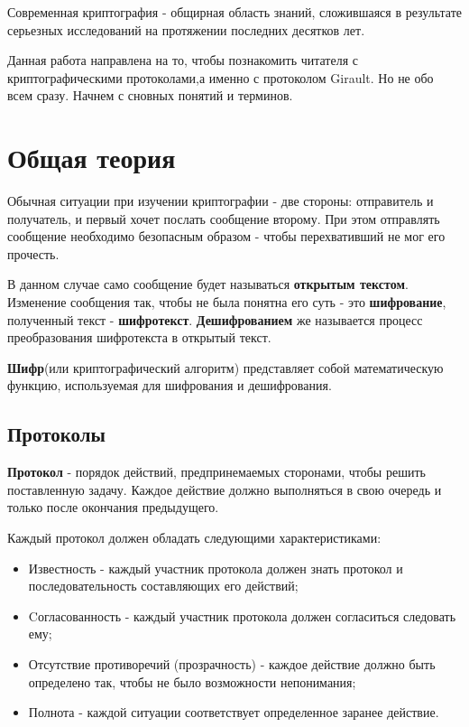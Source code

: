\documentclass[a4paper]{article}
\begin{document}
 Современная криптография - общирная область знаний, сложившаяся в результате серьезных исследований на протяжении последних десятков лет. 
 \par 
 Данная работа направлена на то,
  чтобы познакомить читателя с криптографическими протоколами,а именно с протоколом Girault. Но не обо всем сразу. Начнем с сновных понятий и терминов.

\section{Общая теория}

Обычная ситуации при изучении криптографии - две стороны: отправитель и получатель, и первый хочет послать сообщение второму. При этом отправлять сообщение необходимо безопасным образом -  чтобы перехвативший не мог его прочесть. \par
В данном случае само сообщение будет называться \textbf{открытым текстом}. Изменение сообщения так, чтобы не была понятна его суть - это \textbf{шифрование}, полученный текст - \textbf{шифротекст}.
\textbf{Дешифрованием} же называется процесс преобразования шифротекста в открытый текст.

\textbf{Шифр}(или криптографический алгоритм) представляет собой математическую функцию, используемая для шифрования и дешифрования.

\subsection{Протоколы}
\textbf{Протокол} - порядок действий, предпринемаемых сторонами, чтобы решить поставленную задачу. Каждое действие должно выполняться в свою очередь и только
после окончания предыдущего.
\par
Каждый протокол должен обладать следующими характеристиками:
\begin{itemize}
    \item Известность - каждый участник протокола должен знать протокол и последовательность составляющих его действий;
    \item Cогласованность - каждый участник протокола должен согласиться следовать ему;
    \item Отсутствие противоречий (прозрачность) - каждое действие должно быть определено так, чтобы не было возможности непонимания;
    \item Полнота -  каждой ситуации соответствует определенное заранее действие.
\end{itemize}
\end{document}
